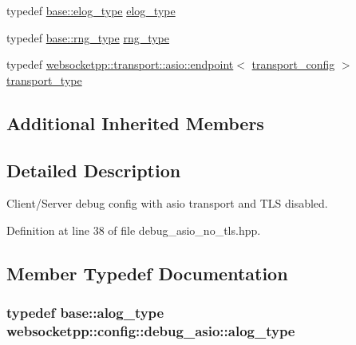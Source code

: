 \begin{DoxyCompactItemize}
\item 
typedef \hyperlink{structwebsocketpp_1_1config_1_1debug__core_acfa1ded7f80d6a7276b0ec3fd0859fc3}{base\+::elog\+\_\+type} \hyperlink{structwebsocketpp_1_1config_1_1debug__asio_a05c9a14cdc8cab4614caebf24a409364}{elog\+\_\+type}
\item 
typedef \hyperlink{structwebsocketpp_1_1config_1_1debug__core_ae59c72992beaef76957c8bfe407394e8}{base\+::rng\+\_\+type} \hyperlink{structwebsocketpp_1_1config_1_1debug__asio_a9791c89350a790dd652cd7944cde3a3d}{rng\+\_\+type}
\item 
typedef \hyperlink{classwebsocketpp_1_1transport_1_1asio_1_1endpoint}{websocketpp\+::transport\+::asio\+::endpoint}$<$ \hyperlink{structwebsocketpp_1_1config_1_1debug__asio_1_1transport__config}{transport\+\_\+config} $>$ \hyperlink{structwebsocketpp_1_1config_1_1debug__asio_a336ec3195f646c6b3c5d344beb9dc5b7}{transport\+\_\+type}
\end{DoxyCompactItemize}
\subsection*{Additional Inherited Members}


\subsection{Detailed Description}
Client/\+Server debug config with asio transport and T\+L\+S disabled. 

Definition at line 38 of file debug\+\_\+asio\+\_\+no\+\_\+tls.\+hpp.



\subsection{Member Typedef Documentation}
\hypertarget{structwebsocketpp_1_1config_1_1debug__asio_a08d4d37527b8126eebf4baf4b277e04f}{}
\subsubsection[{alog\+\_\+type}]{\setlength{\rightskip}{0pt plus 5cm}typedef {\bf base\+::alog\+\_\+type} {\bf websocketpp\+::config\+::debug\+\_\+asio\+::alog\+\_\+type}}\label{structwebsocketpp_1_1config_1_1debug__asio_a08d4d37527b8126eebf4baf4b277e04f}


